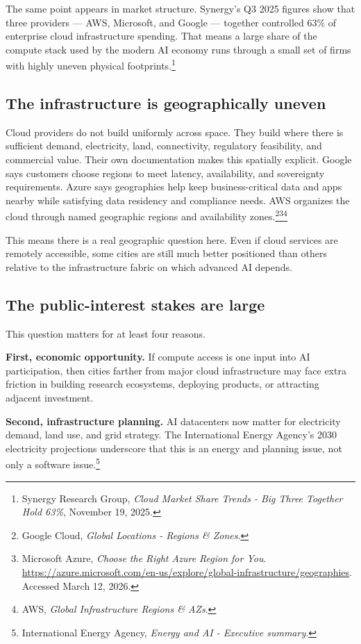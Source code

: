 \documentclass[11pt]{article}
\begin{document}
The same point appears in market structure. Synergy's Q3 2025 figures show that three providers --- AWS, Microsoft, and Google --- together controlled 63\% of enterprise cloud infrastructure spending. That means a large share of the compute stack used by the modern AI economy runs through a small set of firms with highly uneven physical footprints.\footnote{Synergy Research Group, \emph{Cloud Market Share Trends - Big Three Together Hold 63\%}, November 19, 2025.}

\subsection{The infrastructure is geographically uneven}

Cloud providers do not build uniformly across space. They build where there is sufficient demand, electricity, land, connectivity, regulatory feasibility, and commercial value. Their own documentation makes this spatially explicit. Google says customers choose regions to meet latency, availability, and sovereignty requirements. Azure says geographies help keep business-critical data and apps nearby while satisfying data residency and compliance needs. AWS organizes the cloud through named geographic regions and availability zones.\footnote{Google Cloud, \emph{Global Locations - Regions \& Zones}.}\footnote{Microsoft Azure, \emph{Choose the Right Azure Region for You}. \url{https://azure.microsoft.com/en-us/explore/global-infrastructure/geographies}. Accessed March 12, 2026.}\footnote{AWS, \emph{Global Infrastructure Regions \& AZs}.}

This means there is a real geographic question here. Even if cloud services are remotely accessible, some cities are still much better positioned than others relative to the infrastructure fabric on which advanced AI depends.

\subsection{The public-interest stakes are large}

This question matters for at least four reasons.

\textbf{First, economic opportunity.} If compute access is one input into AI participation, then cities farther from major cloud infrastructure may face extra friction in building research ecosystems, deploying products, or attracting adjacent investment.

\textbf{Second, infrastructure planning.} AI datacenters now matter for electricity demand, land use, and grid strategy. The International Energy Agency's 2030 electricity projections underscore that this is an energy and planning issue, not only a software issue.\footnote{International Energy Agency, \emph{Energy and AI - Executive summary}.}
\end{document}
